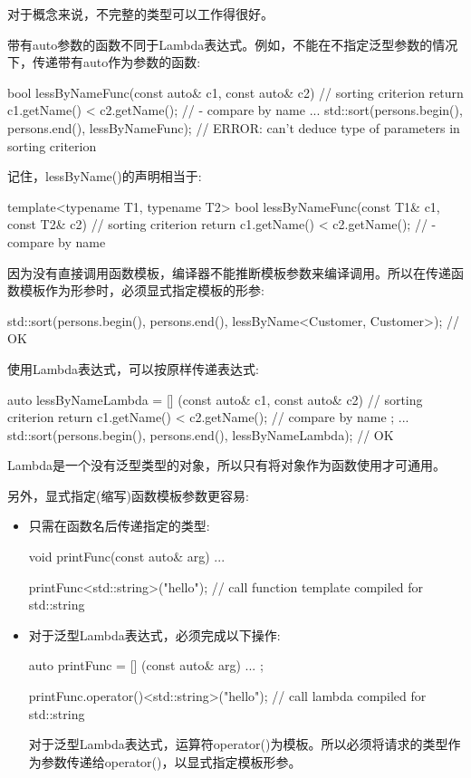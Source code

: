 对于概念来说，不完整的类型可以工作得很好。


带有auto参数的函数不同于Lambda表达式。例如，不能在不指定泛型参数的情况下，传递带有auto作为参数的函数:

\begin{cpp}
bool lessByNameFunc(const auto& c1, const auto& c2) { // sorting criterion
	return c1.getName() < c2.getName(); // - compare by name
}
...
std::sort(persons.begin(), persons.end(),
		  lessByNameFunc); // ERROR: can’t deduce type of parameters in sorting criterion
\end{cpp}

记住，lessByName()的声明相当于:

\begin{cpp}
template<typename T1, typename T2>
bool lessByNameFunc(const T1& c1, const T2& c2) { // sorting criterion
	return c1.getName() < c2.getName(); // - compare by name
}
\end{cpp}

因为没有直接调用函数模板，编译器不能推断模板参数来编译调用。所以在传递函数模板作为形参时，必须显式指定模板的形参:

\begin{cpp}
std::sort(persons.begin(), persons.end(),
		  lessByName<Customer, Customer>); // OK
\end{cpp}

使用Lambda表达式，可以按原样传递表达式:

\begin{cpp}
auto lessByNameLambda = [] (const auto& c1, const auto& c2) { // sorting criterion
							return c1.getName() < c2.getName(); // compare by name
						};
...
std::sort(persons.begin(), persons.end(),
		  lessByNameLambda); // OK
\end{cpp}

Lambda是一个没有泛型类型的对象，所以只有将对象作为函数使用才可通用。

另外，显式指定(缩写)函数模板参数更容易:

\begin{itemize}
\item
只需在函数名后传递指定的类型:

\begin{cpp}
void printFunc(const auto& arg) {
	...
}

printFunc<std::string>("hello"); // call function template compiled for std::string
\end{cpp}

\item
对于泛型Lambda表达式，必须完成以下操作:

\begin{cpp}
auto printFunc = [] (const auto& arg) {
	...
};

printFunc.operator()<std::string>("hello"); // call lambda compiled for std::string
\end{cpp}

对于泛型Lambda表达式，运算符operator()为模板。所以必须将请求的类型作为参数传递给operator()，以显式指定模板形参。
\end{itemize}






